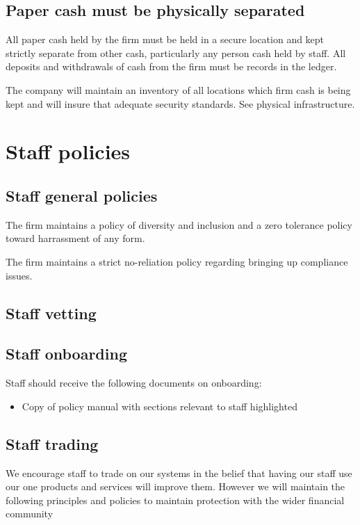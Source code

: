 \subsection{Paper cash must be physically separated}
All paper cash held by the firm must be held in a secure location and
kept strictly separate from other cash, particularly any person cash
held by staff.  All deposits and withdrawals of cash from the firm
must be records in the ledger.

The company will maintain an inventory of all locations which firm
cash is being kept and will insure that adequate security standards.
See physical infrastructure.

\section{Staff policies}

\subsection{Staff general policies}

The firm maintains a policy of diversity and inclusion and a zero
tolerance policy toward harrassment of any form.

The firm maintains a strict no-reliation policy regarding bringing up
compliance issues.

\subsection{Staff vetting}

\subsection{Staff onboarding}

Staff should receive the following documents on onboarding:

\begin{itemize}
  \item Copy of policy manual with sections relevant to staff
    highlighted
\end{itemize}

\subsection{Staff trading}

We encourage staff to trade on our systems in the belief that having
our staff use our one products and services will improve them.
However we will maintain the following principles and policies to
maintain protection with the wider financial community

